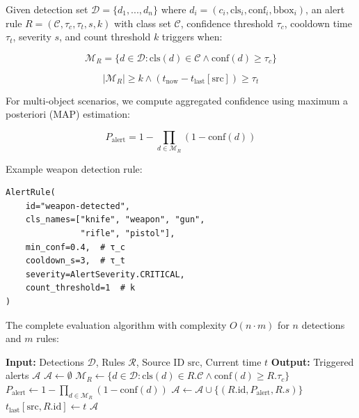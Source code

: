 \documentclass[conference]{IEEEtran}
\begin{document}
Given detection set $\mathcal{D} = \{d_1, ..., d_n\}$ where $d_i = (c_i, \text{cls}_i, \text{conf}_i, \text{bbox}_i)$, an alert rule $R = (\mathcal{C}, \tau_c, \tau_t, s, k)$ with class set $\mathcal{C}$, confidence threshold $\tau_c$, cooldown time $\tau_t$, severity $s$, and count threshold $k$ triggers when:

\begin{equation}
\mathcal{M}_R = \{d \in \mathcal{D} : \text{cls}(d) \in \mathcal{C} \land \text{conf}(d) \geq \tau_c\}
\end{equation}

\begin{equation}
|\mathcal{M}_R| \geq k \land (t_{\text{now}} - t_{\text{last}}[\text{src}]) \geq \tau_t
\end{equation}

For multi-object scenarios, we compute aggregated confidence using maximum a posteriori (MAP) estimation:

\begin{equation}
P_{\text{alert}} = 1 - \prod_{d \in \mathcal{M}_R} (1 - \text{conf}(d))
\end{equation}

Example weapon detection rule:

\begin{verbatim}
AlertRule(
    id="weapon-detected",
    cls_names=["knife", "weapon", "gun", 
               "rifle", "pistol"],
    min_conf=0.4,  # τ_c
    cooldown_s=3,  # τ_t  
    severity=AlertSeverity.CRITICAL,
    count_threshold=1  # k
)
\end{verbatim}

The complete evaluation algorithm with complexity $O(n \cdot m)$ for $n$ detections and $m$ rules:

\begin{algorithmic}
\STATE \textbf{Input:} Detections $\mathcal{D}$, Rules $\mathcal{R}$, Source ID $\text{src}$, Current time $t$
\STATE \textbf{Output:} Triggered alerts $\mathcal{A}$
\STATE $\mathcal{A} \gets \emptyset$
    \STATE $\mathcal{M}_R \gets \{d \in \mathcal{D} : \text{cls}(d) \in R.\mathcal{C} \land \text{conf}(d) \geq R.\tau_c\}$
            \STATE $P_{\text{alert}} \gets 1 - \prod_{d \in \mathcal{M}_R} (1 - \text{conf}(d))$
            \STATE $\mathcal{A} \gets \mathcal{A} \cup \{(R.\text{id}, P_{\text{alert}}, R.s)\}$
            \STATE $t_{\text{last}}[\text{src}, R.\text{id}] \gets t$
        \ENDIF
    \ENDIF
\ENDFOR
\RETURN $\mathcal{A}$
\end{algorithmic}
\end{document}
